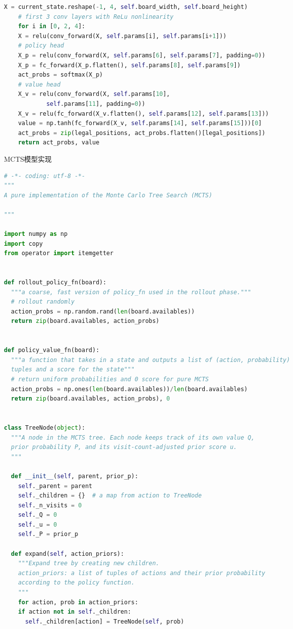 \documentclass[a4paper]{article}
\begin{document}
\begin{multicols}{2}
\begin{lstlisting}[language=Python,breaklines = true,columns=flexible]
    X = current_state.reshape(-1, 4, self.board_width, self.board_height)
    # first 3 conv layers with ReLu nonlinearity
    for i in [0, 2, 4]:
    X = relu(conv_forward(X, self.params[i], self.params[i+1]))
    # policy head
    X_p = relu(conv_forward(X, self.params[6], self.params[7], padding=0))
    X_p = fc_forward(X_p.flatten(), self.params[8], self.params[9])
    act_probs = softmax(X_p)
    # value head
    X_v = relu(conv_forward(X, self.params[10],
            self.params[11], padding=0))
    X_v = relu(fc_forward(X_v.flatten(), self.params[12], self.params[13]))
    value = np.tanh(fc_forward(X_v, self.params[14], self.params[15]))[0]
    act_probs = zip(legal_positions, act_probs.flatten()[legal_positions])
    return act_probs, value
  \end{lstlisting}
  MCTS模型实现
  \begin{lstlisting}[language=Python,breaklines = true,columns=flexible]
  # -*- coding: utf-8 -*-
"""
A pure implementation of the Monte Carlo Tree Search (MCTS)

"""

import numpy as np
import copy
from operator import itemgetter


def rollout_policy_fn(board):
  """a coarse, fast version of policy_fn used in the rollout phase."""
  # rollout randomly
  action_probs = np.random.rand(len(board.availables))
  return zip(board.availables, action_probs)


def policy_value_fn(board):
  """a function that takes in a state and outputs a list of (action, probability)
  tuples and a score for the state"""
  # return uniform probabilities and 0 score for pure MCTS
  action_probs = np.ones(len(board.availables))/len(board.availables)
  return zip(board.availables, action_probs), 0


class TreeNode(object):
  """A node in the MCTS tree. Each node keeps track of its own value Q,
  prior probability P, and its visit-count-adjusted prior score u.
  """

  def __init__(self, parent, prior_p):
    self._parent = parent
    self._children = {}  # a map from action to TreeNode
    self._n_visits = 0
    self._Q = 0
    self._u = 0
    self._P = prior_p

  def expand(self, action_priors):
    """Expand tree by creating new children.
    action_priors: a list of tuples of actions and their prior probability
    according to the policy function.
    """
    for action, prob in action_priors:
    if action not in self._children:
      self._children[action] = TreeNode(self, prob)


\end{lstlisting}
\end{multicols}
\end{document}
